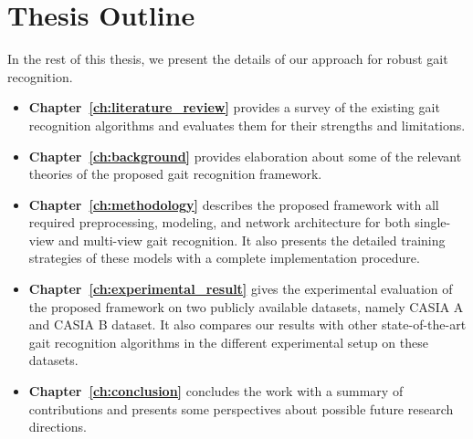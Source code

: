 \section{Thesis Outline} 
In the rest of this thesis, we present the details of our approach for robust gait recognition.

\begin{itemize}
\item \textbf{Chapter~\ref{ch:literature_review}} provides a survey of the existing gait recognition algorithms and evaluates them for their strengths and limitations.

\item \textbf{Chapter~\ref{ch:background}} provides elaboration about some of the relevant theories of the proposed gait recognition framework.

\item \textbf{Chapter~\ref{ch:methodology}} describes the proposed framework with all required preprocessing, modeling, and network architecture for both single-view and multi-view gait recognition. It also presents the detailed training strategies of these models with a complete implementation procedure.

\item \textbf{Chapter~\ref{ch:experimental_result}} gives the experimental evaluation of the proposed framework on two publicly available datasets, namely CASIA A and CASIA B dataset. It also compares our results with other state-of-the-art gait recognition algorithms in the different experimental setup on these datasets. 

\item \textbf{Chapter~\ref{ch:conclusion}} concludes the work with a summary of contributions and presents some perspectives about possible future research directions.
\end{itemize}
